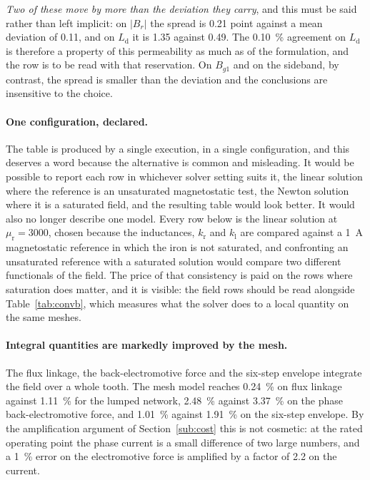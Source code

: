 \documentclass[10pt,a4paper,twocolumn]{article}
\theoremstyle{plain}
\theoremstyle{remark}
\begin{document}
\emph{Two of these move by more than the deviation they carry}, and this
must be said rather than left implicit: on $\lvert B_r\rvert$ the spread
is \num{0.21} point against a mean deviation of \num{0.11}, and on
$L_{\mathrm{d}}$ it is \num{1.35} against \num{0.49}. The
\SI{0.10}{\percent} agreement on $L_{\mathrm{d}}$ is therefore a
property of this permeability as much as of the formulation, and the
row is to be read with that reservation. On $B_{g1}$ and on the
sideband, by contrast, the spread is smaller than the deviation and the
conclusions are insensitive to the choice.

\paragraph{One configuration, declared.}
The table is produced by a single execution, in a single configuration,
and this deserves a word because the alternative is common and
misleading. It would be possible to report each row in whichever solver
setting suits it, the linear solution where the reference is an
unsaturated magnetostatic test, the Newton solution where it is a
saturated field, and the resulting table would look better. It would
also no longer describe one model. Every row below is the linear
solution at $\mu_{\mathrm{r}}=\num{3000}$, chosen because the
inductances, $k_{\mathrm{r}}$ and $k_{\mathrm{l}}$ are compared against a
\SI{1}{\ampere} magnetostatic reference in which the iron is not
saturated, and confronting an unsaturated reference with a saturated
solution would compare two different functionals of the field. The price
of that consistency is paid on the rows where saturation does matter,
and it is visible: the field rows should be read alongside
Table~\ref{tab:convb}, which measures what the solver does to a local
quantity on the same meshes.

\paragraph{Integral quantities are markedly improved by the mesh.}
The flux linkage, the back-electromotive force and the six-step envelope
integrate the field over a whole tooth. The mesh model reaches
\SI{+0.24}{\percent} on flux linkage against \SI{+1.11}{\percent} for the
lumped network, \SI{+2.48}{\percent} against \SI{+3.37}{\percent} on the
phase back-electromotive force, and \SI{+1.01}{\percent} against
\SI{+1.91}{\percent} on the six-step envelope. By the amplification
argument of Section~\ref{sub:cost} this is not cosmetic: at the rated
operating point the phase current is a small difference of two large
numbers, and a \SI{1}{\percent} error on the electromotive force is
amplified by a factor of 2.2 on the current.
\end{document}
